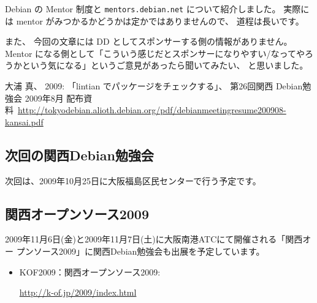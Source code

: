 \documentclass[mingoth,a4paper]{jsarticle}
\begin{document}
Debian の Mentor 制度と {\tt mentors.debian.net} について紹介しました。
実際には mentor がみつかるかどうかは定かではありませんので、 道程は長いです。

また、 今回の文章には DD としてスポンサーする側の情報がありません。 
Mentor になる側として「こういう感じだとスポンサーになりやすい/なってやろうかという気になる」というご意見があったら聞いてみたい、 と思いました。

\begin{thebibliography}{99}
  大浦 真、 2009:
  「lintian でパッケージをチェックする」、
  第26回関西 Debian勉強会 2009年8月 配布資料\
  \url{http://tokyodebian.alioth.debian.org/pdf/debianmeetingresume200908-kansai.pdf}
\end{thebibliography}


\subsection{次回の関西Debian勉強会}

次回は、2009年10月25日に大阪福島区民センターで行う予定です。

\subsection{関西オープンソース2009}

2009年11月6日(金)と2009年11月7日(土)に大阪南港ATCにて開催される「関西オー
プンソース2009」に関西Debian勉強会も出展を予定しています。

\begin{itemize}
 \item KOF2009：関西オープンソース2009:

\url{http://k-of.jp/2009/index.html} 

\end{itemize}


\mbox{}\newpage
\mbox{}\newpage

\printindex
 \cleartooddpage
\end{document}
